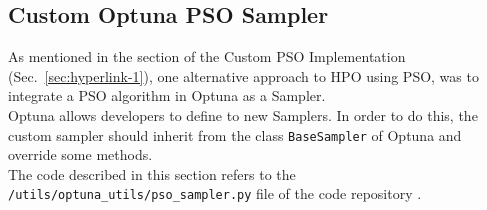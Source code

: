 % 
% 
% 
% 
% 
% 

\subsection{Custom Optuna PSO Sampler}
As mentioned in the section of the Custom PSO Implementation (Sec.~\ref{sec:hyperlink-1}), one alternative approach to HPO using PSO, was to integrate a PSO algorithm in Optuna as a Sampler.
\\[0.3cm]Optuna allows developers to define to new Samplers. In order to do this, the custom sampler should inherit from the class \texttt{BaseSampler} of Optuna and override some methods.
\\[0.3cm]The code described in this section refers to the \texttt{/utils/optuna\_utils/pso\_sampler.py} file of the code repository \cite{Repository-THESIS}.

